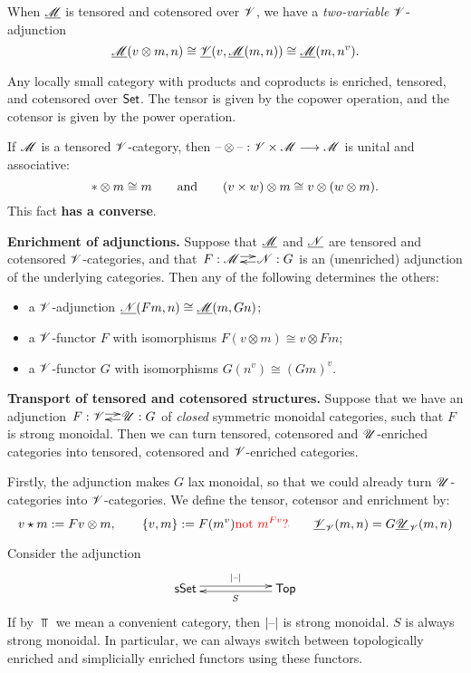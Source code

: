 \documentclass[11pt]{article}
\begin{document}
\begin{4. Basic concepts in enriched category theory}
\begin{itemise}
\item When $\underline{\mathscr{M}}$ is tensored and cotensored over $\mathscr{V}$, we have a \emph{two-variable} $\mathscr{V}$-adjunction
\[\underline{\mathscr{M}}(v\otimes m,n)\cong\underline{\mathscr{V}}(v,\underline{\mathscr{M}}(m,n))\cong\underline{\mathscr{M}}(m,n^v).\]
\item Any locally small category with products and coproducts is enriched, tensored, and cotensored over $\operatorname{{\mathsf{Set}}}$. The tensor is given by the copower operation, and the cotensor is given by the power operation.
\item If $\mathscr{M}$ is a tensored $\mathscr{V}$-category, then $\textup{--} \otimes \textup{--} :\mathscr{V}\times \mathscr{M}\longrightarrow\mathscr{M}$ is unital and associative:
\[*\otimes m\cong m\qquad\textup{and} \qquad (v\times w)\otimes m\cong v\otimes (w\otimes m).\]
This fact \textbf{has a converse}.
\item \textbf{Enrichment of adjunctions.} Suppose that $\underline{\mathscr{M}}$ and $\underline{\mathscr{N}}$ are tensored and cotensored $\mathscr{V}$-categories, and that 
$\xymatrix@C=.41cm@1{
F:\scrM  \ar@<.6ex>[r]&
\scrN:G  \ar@<.4ex>[l]
}$
 is an (unenriched) adjunction of the underlying categories. Then any of the following determines the others:
\begin{itemize}\squishlist
\setlength{\parindent}{.25in}
\item a $\mathscr{V}$-adjunction $\underline{\mathscr{N}}(Fm,n)\cong\underline{\mathscr{M}}(m,Gn)$;
\item a $\mathscr{V}$-functor $F$ with isomorphisms $F(v\otimes m)\cong v\otimes Fm$;
\item a $\mathscr{V}$-functor $G$ with isomorphisms $G(n^v)\cong (Gm)^v$.
\end{itemize}
\item \textbf{Transport of tensored and cotensored structures.} Suppose that we have an adjunction  $\xymatrix@C=.41cm@1{
F:\scrV  \ar@<.6ex>[r]&
\scrU:G  \ar@<.4ex>[l]
}$ of \emph{closed} symmetric monoidal categories, such that $F$ is strong monoidal. Then we can turn tensored, cotensored and $\mathscr{U}$-enriched categories into tensored, cotensored and $\mathscr{V}$-enriched categories.

Firstly, the adjunction makes $G$ lax monoidal, so that we could already turn $\mathscr{U}$-categories into $\mathscr{V}$-categories. We define the tensor, cotensor and enrichment by:
\[v\star m:=Fv\otimes m,\qquad \{v,m\}:=F(m^v)\rednote{\textup{not $m^{Fv}$?}} \qquad \underline{\scrV}_\scrV(m,n)= G\underline{\scrU}_\scrV(m,n)\]
\item Consider the adjunction
\[\xymatrix@R=.3cm@C=2cm{
\sSet  \ar@<.6ex>[r]^{|\DASH |}&
\Top  \ar@<.4ex>[l]^{S}\\
}\]
If by $\Top$ we mean a convenient category, then $|\textup{--} |$ is strong monoidal. $S$ is always strong monoidal. In particular, we can always switch between topologically enriched and simplicially enriched functors using these functors.


\end{itemise}
\end{4. Basic concepts in enriched category theory}
\end{document}
